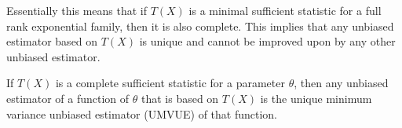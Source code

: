 \documentclass[answers,12pt,addpoints]{exam}
\begin{document}
\begin{theorem}
    Essentially this means that if $T(X)$ is a minimal sufficient statistic for a full rank exponential family, then it is also complete. This implies that any unbiased estimator based on $T(X)$ is unique and cannot be improved upon by any other unbiased estimator.
\end{theorem}

\begin{theorem}
     If $T(X)$ is a complete sufficient statistic for a parameter $\theta$, then any unbiased estimator of a function of $\theta$ that is based on $T(X)$ is the unique minimum variance unbiased estimator (UMVUE) of that function.
\end{theorem}
\end{document}
